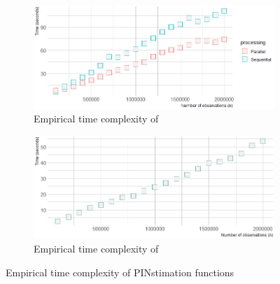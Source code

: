 \begin{figure}[H]
    \centering
\begin{subfigure}[b]{0.8\textwidth}
    \centering
    \includegraphics[width=\linewidth]{images/aggregate_complexity.png}
    \caption{Empirical time complexity of }
    \label{subfig:complexity_aggregate}
  \end{subfigure}
  \begin{subfigure}[b]{0.8\textwidth}
    \centering
    \includegraphics[width=\linewidth]{images/vpin_complexity.png}
    \caption{Empirical time complexity of }
    \label{subfig:complexity_vpin}
  \end{subfigure}
  \caption{Empirical time complexity of PINstimation functions}
\label{tab:time_complexity}
\end{figure}


